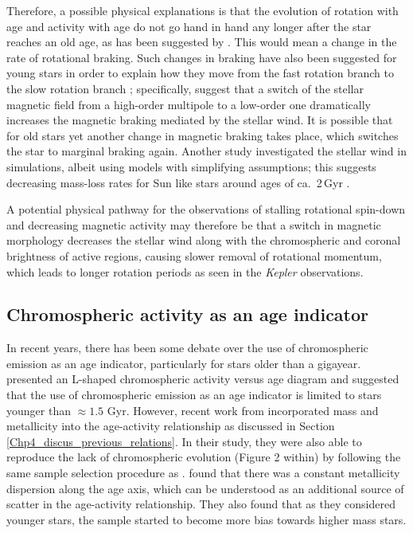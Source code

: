 Therefore, a possible physical explanations is that the evolution of rotation with age and activity with age do not go hand in hand any longer after the star reaches an old age, as has been suggested by \citet{Booth_etal_2017}. This would mean a change in the rate of rotational braking. Such changes in braking have also been suggested for young stars in order to explain how they move from the fast rotation branch to the slow rotation branch \citep{Garraffo_etal_2015, Garraffo_etal_2018}; specifically, \citet{Garraffo_etal_2016} suggest that a switch of the stellar magnetic field from a high-order multipole to a low-order one dramatically increases the magnetic braking mediated by the stellar wind. It is possible that for old stars yet another change in magnetic braking takes place, which switches the star to marginal braking again. Another study investigated the stellar wind in simulations, albeit using models with simplifying assumptions; this suggests decreasing mass-loss rates for Sun like stars around ages of ca.\ 2\,Gyr \citep{OFionnagain_Vidotto_2018}.

A potential physical pathway for the observations of stalling rotational spin-down and decreasing magnetic activity may therefore be that a switch in magnetic morphology decreases the stellar wind along with the chromospheric and coronal brightness of active regions, causing slower removal of rotational momentum, which leads to longer rotation periods as seen in the \textit{Kepler} observations.

\subsection{Chromospheric activity as an age indicator}

In recent years, there has been some debate over the use of chromospheric emission as an age indicator, particularly for stars older than a gigayear. \citet{Pace_2013} presented an L-shaped chromospheric activity versus age diagram and suggested that the use of chromospheric emission as an age indicator is limited to stars younger than $\approx 1.5$ Gyr. However, recent work from \citet{Lorenzo_Oliveira_etal_2016} incorporated mass and metallicity into the age-activity relationship as discussed in Section \ref{Chp4_discus_previous_relations}. In their study, they were also able to reproduce the lack of chromospheric evolution (Figure 2 within) by following the same sample selection procedure as \citet{Pace_2013}. \citet{Lorenzo_Oliveira_etal_2016} found that there was a constant metallicity dispersion along the age axis, which can be understood as an additional source of scatter in the age-activity relationship. They also found that as they considered younger stars, the sample started to become more bias towards higher mass stars.

